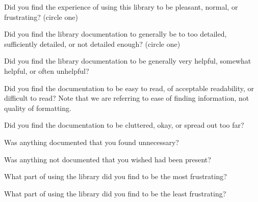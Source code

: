 \documentclass{article}
\let\Enumerate =\enumerate
\def\Nospacing{\itemsep=0pt\topsep=0pt\partopsep=0pt\parskip=0pt\parsep=0pt}
\renewenvironment{enumerate}{\Enumerate\Nospacing}{\endlist}
\begin{document}
\begin{enumerate}
\item Did you find the experience of using this library to be pleasant, normal,
or frustrating? (circle one)\\
\item Did you find the library documentation to generally be to too detailed, sufficiently
detailed, or not detailed enough? (circle one)\\
\item Did you find the library documentation to be generally very helpful,
somewhat helpful, or often unhelpful?\\
\item Did you find the documentation to be easy to read, of acceptable
readability, or difficult to read?  Note that we are referring to ease of
finding information, not quality of formatting.\\
\item Did you find the documentation to be cluttered, okay, or spread out too
far?\\
\item Was anything documented that you found unnecessary?\\\vspace{1in}
\item Was anything not documented that you wished had been present?\\\vspace{1in}
\item What part of using the library did you find to be the most
frustrating?\\\vspace{1in}
\item What part of using the library did you find to be the least
frustrating?\\\vspace{1in}
\end{enumerate}
\end{document}
